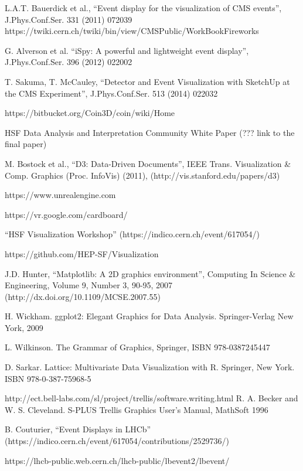 \documentclass[12pt,a4paper]{article}
\begin{document}
\begin{thebibliography}{999}
 L.A.T. Bauerdick et al., “Event display for the visualization of CMS events”, J.Phys.Conf.Ser. 331 (2011) 072039 https://twiki.cern.ch/twiki/bin/view/CMSPublic/WorkBookFireworks

 G. Alverson et al. “iSpy: A powerful and lightweight event display”, J.Phys.Conf.Ser. 396 (2012) 022002

 T. Sakuma, T. McCauley, “Detector and Event Visualization with SketchUp at the CMS Experiment”, J.Phys.Conf.Ser. 513 (2014) 022032

 https://bitbucket.org/Coin3D/coin/wiki/Home

 HSF Data Analysis and Interpretation Community White Paper (??? link to the final paper)

 M. Bostock et al., “D3: Data-Driven Documents”, IEEE Trans. Visualization \& Comp. Graphics (Proc. InfoVis) (2011), (http://vis.stanford.edu/papers/d3)

 https://www.unrealengine.com

 https://vr.google.com/cardboard/

 “HSF Visualization Workshop” (https://indico.cern.ch/event/617054/)

 https://github.com/HEP-SF/Visualization

 J.D. Hunter, “Matplotlib: A 2D graphics environment”, Computing In Science \& Engineering, Volume 9, Number 3, 90-95, 2007 (http://dx.doi.org/10.1109/MCSE.2007.55)

 H. Wickham. ggplot2: Elegant Graphics for Data Analysis. Springer-Verlag New York, 2009

 L. Wilkinson. The Grammar of Graphics, Springer, ISBN 978-0387245447

 D. Sarkar. Lattice: Multivariate Data Visualization with R. Springer, New York. ISBN 978-0-387-75968-5

 http://ect.bell-labs.com/sl/project/trellis/software.writing.html
 R. A. Becker and W. S. Cleveland. S-PLUS Trellis Graphics User's Manual, MathSoft 1996

 B. Couturier, “Event Displays in LHCb” (https://indico.cern.ch/event/617054/contributions/2529736/)

 https://lhcb-public.web.cern.ch/lhcb-public/lbevent2/lbevent/


\end{thebibliography}
\end{document}
